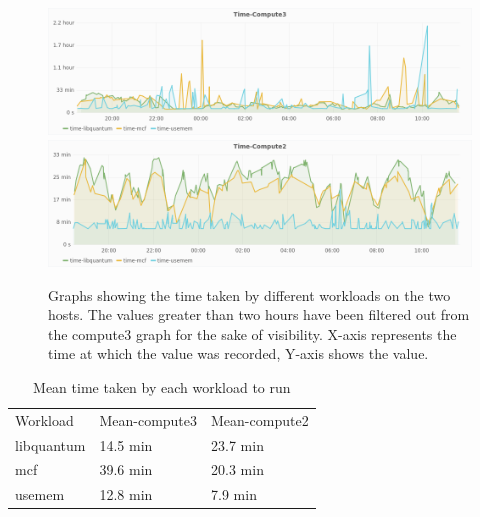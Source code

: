 \begin{figure}
  \centering
  \includegraphics[width=\textwidth]{time-compute3.png}
  \includegraphics[width=\textwidth]{time-compute2.png}
  \caption{Graphs showing the time taken by different workloads on the two hosts. The values greater than two hours have been filtered out from the compute3 graph for the sake of visibility. X-axis represents the time at which the value was recorded, Y-axis shows the value.}\label{fig:time}
\end{figure}


\begin{table}[!htbp]
\caption{Mean time taken by each workload to run}
\label{tab:mean}
\begin{center}
\begin{tabularx}{0.91\textwidth}{XXX}
\hline\noalign{\smallskip}
Workload & Mean-compute3 & Mean-compute2\\
\noalign{\smallskip}
\hline
\noalign{\smallskip}
libquantum & 14.5 min & 23.7 min\\

mcf & 39.6 min & 20.3 min\\

usemem & 12.8 min & 7.9 min \\
\hline
\end{tabularx}
\end{center}
\end{table}

